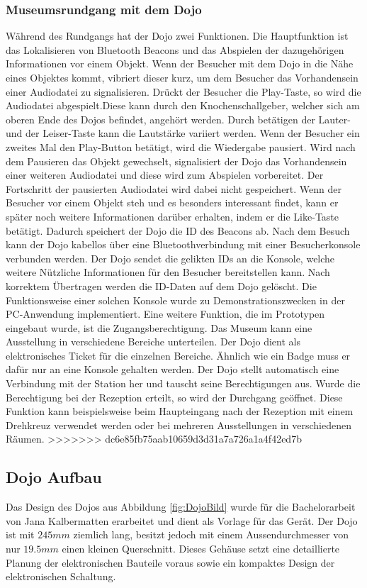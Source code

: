 \subsubsection{Museumsrundgang mit dem Dojo}
Während des Rundgangs hat der Dojo zwei Funktionen. Die Hauptfunktion ist das Lokalisieren von Bluetooth Beacons und das Abspielen der dazugehörigen Informationen vor einem Objekt. Wenn der Besucher mit dem Dojo in die Nähe eines Objektes kommt, vibriert dieser kurz, um dem Besucher das Vorhandensein einer Audiodatei zu signalisieren. Drückt der Besucher die Play-Taste, so wird die Audiodatei abgespielt.Diese kann durch den Knochenschallgeber, welcher sich am oberen Ende des Dojos befindet, angehört werden. Durch betätigen der Lauter- und der Leiser-Taste kann die Lautstärke variiert werden. Wenn der Besucher ein zweites Mal den Play-Button betätigt, wird die Wiedergabe pausiert.  Wird nach dem Pausieren das Objekt gewechselt, signalisiert der Dojo das Vorhandensein einer weiteren Audiodatei und diese wird zum Abspielen vorbereitet. Der Fortschritt der pausierten Audiodatei wird dabei nicht gespeichert. Wenn der Besucher vor einem Objekt steh und es besonders interessant findet, kann er später noch weitere Informationen darüber erhalten, indem er die Like-Taste betätigt. Dadurch speichert der Dojo die ID des Beacons ab. Nach dem Besuch kann der Dojo kabellos über eine Bluetoothverbindung mit einer Besucherkonsole verbunden werden. Der Dojo sendet die gelikten IDs an die Konsole, welche weitere Nützliche Informationen für den Besucher bereitstellen kann. Nach korrektem Übertragen werden die ID-Daten auf dem Dojo gelöscht. Die Funktionsweise einer solchen Konsole wurde zu Demonstrationszwecken in der PC-Anwendung implementiert.
Eine weitere Funktion, die im Prototypen eingebaut wurde, ist die Zugangsberechtigung. Das Museum kann eine Ausstellung in verschiedene Bereiche unterteilen. Der Dojo dient als elektronisches Ticket für die einzelnen Bereiche. Ähnlich wie ein Badge muss er dafür nur an eine Konsole gehalten werden. Der Dojo stellt automatisch eine Verbindung mit der Station her und tauscht seine Berechtigungen aus. Wurde die Berechtigung bei der Rezeption erteilt, so wird der Durchgang geöffnet. Diese Funktion kann beispielsweise beim Haupteingang nach der Rezeption mit einem Drehkreuz verwendet werden oder bei mehreren Ausstellungen in verschiedenen Räumen.
>>>>>>> dc6e85fb75aab10659d3d31a7a726a1a4f42ed7b
\clearpage
\subsection{Dojo Aufbau}
Das Design des Dojos aus Abbildung \ref{fig:DojoBild} wurde für die Bachelorarbeit von Jana Kalbermatten erarbeitet und dient als Vorlage für das Gerät. Der Dojo ist mit $245mm$ ziemlich lang, besitzt jedoch mit einem Aussendurchmesser von nur $19.5mm$ einen kleinen Querschnitt. Dieses Gehäuse setzt eine detaillierte Planung der elektronischen Bauteile voraus sowie ein kompaktes Design der elektronischen Schaltung.



